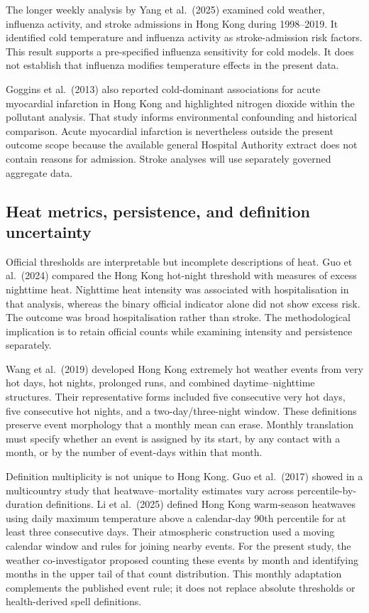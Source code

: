 \documentclass[11pt,a4paper]{article}
\begin{document}
The longer weekly analysis by Yang et al.\ (2025) examined cold weather, influenza activity, and stroke admissions in Hong Kong during 1998--2019. It identified cold temperature and influenza activity as stroke-admission risk factors. This result supports a pre-specified influenza sensitivity for cold models. It does not establish that influenza modifies temperature effects in the present data.

Goggins et al.\ (2013) also reported cold-dominant associations for acute myocardial infarction in Hong Kong and highlighted nitrogen dioxide within the pollutant analysis. That study informs environmental confounding and historical comparison. Acute myocardial infarction is nevertheless outside the present outcome scope because the available general Hospital Authority extract does not contain reasons for admission. Stroke analyses will use separately governed aggregate data.

\subsection{Heat metrics, persistence, and definition uncertainty}

Official thresholds are interpretable but incomplete descriptions of heat. Guo et al.\ (2024) compared the Hong Kong hot-night threshold with measures of excess nighttime heat. Nighttime heat intensity was associated with hospitalisation in that analysis, whereas the binary official indicator alone did not show excess risk. The outcome was broad hospitalisation rather than stroke. The methodological implication is to retain official counts while examining intensity and persistence separately.

Wang et al.\ (2019) developed Hong Kong extremely hot weather events from very hot days, hot nights, prolonged runs, and combined daytime--nighttime structures. Their representative forms included five consecutive very hot days, five consecutive hot nights, and a two-day/three-night window. These definitions preserve event morphology that a monthly mean can erase. Monthly translation must specify whether an event is assigned by its start, by any contact with a month, or by the number of event-days within that month.

Definition multiplicity is not unique to Hong Kong. Guo et al.\ (2017) showed in a multicountry study that heatwave--mortality estimates vary across percentile-by-duration definitions. Li et al.\ (2025) defined Hong Kong warm-season heatwaves using daily maximum temperature above a calendar-day 90th percentile for at least three consecutive days. Their atmospheric construction used a moving calendar window and rules for joining nearby events. For the present study, the weather co-investigator proposed counting these events by month and identifying months in the upper tail of that count distribution. This monthly adaptation complements the published event rule; it does not replace absolute thresholds or health-derived spell definitions.
\end{document}
